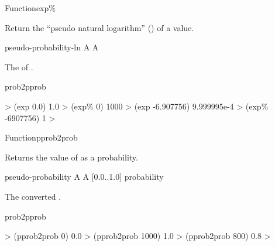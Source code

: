 \documentclass[10pt,twoside,english,pdftex]{article}
\begin{document}
\begin{functiondoc}{Function}{exp\%}%
  {
    }

\fnsyntax

\fnpurpose Return the ``pseudo natural logarithm''
() of a  value.

\fnpackage {}

\fnmodule {}

\fnargs
\begin{args}{pseudo-probability-ln}
 A  
 A  
\end{args}

\fnreturns The   of
.

\begin{alsos}{prob2pprob}
\also[ln\%]
\end{alsos}

\fnexamples
\begin{example}
%
\W\supp
  > (exp 0.0)
  1.0
  > (exp\% 0)
  1000
  > (exp -6.907756)
  9.999995e-4
  > (exp\% -6907756)
  1
  >
\end{example}

\end{functiondoc}


\begin{functiondoc}{Function}{pprob2prob}%
  {
    }
%
%

\fnsyntax

\fnpurpose Returns the value of  as a
probability.

\fnpackage {}

\fnmodule {}

\fnargs
\begin{args}{pseudo-probability}
 A  
\arg[probability] A [0.0..1.0] probability
\end{args}

\fnreturns The converted .

\begin{alsos}{prob2pprob}
\end{alsos}

\fnexamples
\begin{example}
%
\W\supp
  > (pprob2prob 0)
  0.0
  > (pprob2prob 1000)
  1.0
  > (pprob2prob 800)
  0.8
  > 
\end{example}

\end{functiondoc}
\end{document}

